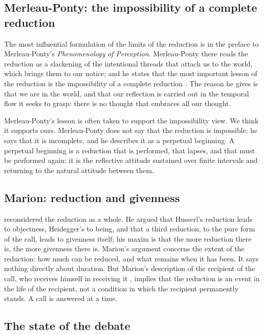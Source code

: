\documentclass{situationist-preprint}
\begin{document}
\subsection{Merleau-Ponty: the impossibility of a complete reduction}

The most influential formulation of the limits of the reduction is in the preface to Merleau-Ponty's \emph{Phenomenology of Perception}. Merleau-Ponty there reads the reduction as a slackening of the intentional threads that attach us to the world, which brings them to our notice; and he states that the most important lesson of the reduction is the impossibility of a complete reduction \citep[Preface]{MerleauPonty1945}. The reason he gives is that we are in the world, and that our reflection is carried out in the temporal flow it seeks to grasp: there is no thought that embraces all our thought.

Merleau-Ponty's lesson is often taken to support the impossibility view. We think it supports ours. Merleau-Ponty does not say that the reduction is impossible; he says that it is incomplete, and he describes it as a perpetual beginning. A perpetual beginning is a reduction that is performed, that lapses, and that must be performed again: it is the reflective attitude sustained over finite intervals and returning to the natural attitude between them.

\subsection{Marion: reduction and givenness}

\citet{Marion1989} reconsidered the reduction as a whole. He argued that Husserl's reduction leads to objectness, Heidegger's to being, and that a third reduction, to the pure form of the call, leads to givenness itself; his maxim is that the more reduction there is, the more givenness there is. Marion's argument concerns the extent of the reduction: how much can be reduced, and what remains when it has been. It says nothing directly about duration. But Marion's description of the recipient of the call, who receives himself in receiving it \citep{Marion1997}, implies that the reduction is an event in the life of the recipient, not a condition in which the recipient permanently stands. A call is answered at a time.

\subsection{The state of the debate}
\end{document}
